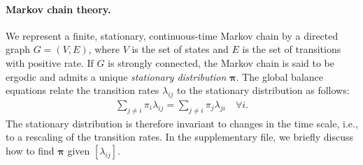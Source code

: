 \paragraph{Markov chain theory.}
We represent a finite, stationary, continuous-time Markov chain by a directed graph $G = (V, E)$, where $V$ is the set of states and $E$ is the set of transitions with positive rate.
If $G$ is strongly connected, the Markov chain is said to be ergodic and admits a unique \emph{stationary distribution} $\bm{\pi}$.
The global balance equations relate the transition rates $\lambda_{ij}$ to the stationary distribution as follows:
\begin{align}
\label{fi:eq:balance}
\sum_{j \ne i} \pi_i \lambda_{ij} = \sum_{j \ne i} \pi_j \lambda_{ji} \quad \forall i.
\end{align}
The stationary distribution is therefore invariant to changes in the time scale, i.e., to a rescaling of the transition rates.
In the supplementary file, we briefly discuss how to find $\bm{\pi}$ given $[\lambda_{ij}]$.
